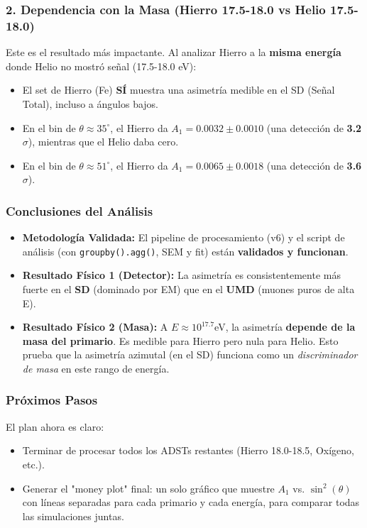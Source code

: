 \subsubsection*{2. Dependencia con la Masa (Hierro 17.5-18.0 vs Helio 17.5-18.0)}
Este es el resultado más impactante. Al analizar Hierro a la \textbf{misma energía} donde Helio no mostró señal (17.5-18.0 eV):
\begin{itemize}
	\item El set de Hierro (Fe) \textbf{SÍ} muestra una asimetría medible en el SD (Señal Total), incluso a ángulos bajos.
	\item En el bin de $\theta \approx 35^\circ$, el Hierro da $A_1 = 0.0032 \pm 0.0010$ (una detección de \textbf{3.2$\sigma$}), mientras que el Helio daba cero.
	\item En el bin de $\theta \approx 51^\circ$, el Hierro da $A_1 = 0.0065 \pm 0.0018$ (una detección de \textbf{3.6$\sigma$}).
\end{itemize}

\subsubsection*{Conclusiones del Análisis}
\begin{itemize}
	\item \textbf{Metodología Validada:} El pipeline de procesamiento (v6) y el script de análisis (con \lstinline|groupby().agg()|, SEM y fit) están \textbf{validados y funcionan}.
	\item \textbf{Resultado Físico 1 (Detector):} La asimetría es consistentemente más fuerte en el \textbf{SD} (dominado por EM) que en el \textbf{UMD} (muones puros de alta E).
	\item \textbf{Resultado Físico 2 (Masa):} A $E \approx 10^{17.7}$eV, la asimetría \textbf{depende de la masa del primario}. Es medible para Hierro pero nula para Helio. Esto prueba que la asimetría azimutal (en el SD) funciona como un \textit{discriminador de masa} en este rango de energía.
\end{itemize}

\subsubsection*{Próximos Pasos}
El plan ahora es claro:
\begin{itemize}
	\item Terminar de procesar todos los ADSTs restantes (Hierro 18.0-18.5, Oxígeno, etc.).
	\item Generar el "money plot" final: un solo gráfico que muestre $A_1$ vs. $\sin^2(\theta)$ con líneas separadas para cada primario y cada energía, para comparar todas las simulaciones juntas.
\end{itemize}

